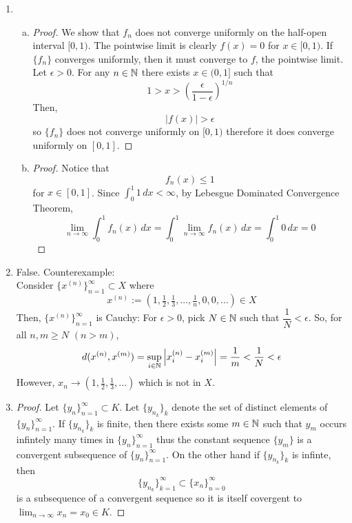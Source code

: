\begin{enumerate}

\item 
	\begin{enumerate}[(a)]
	\item
	\begin{proof}
	We show that $f_n$ does not converge uniformly on the half-open interval $[0,1)$. The pointwise limit is clearly $f(x)=0$ for $x \in [0,1)$. If $\{f_n\}$ converges uniformly, then it must converge to $f$, the pointwise limit. Let $\epsilon >0$. For any $n \in \mathbb{N}$ there exists $x \in (0,1]$ such that
			\[ 1>x > \left( \dfrac{\epsilon}{1-\epsilon} \right)^{1/n} \]
	Then,
			\[ |f(x)| > \epsilon \]
	so $\{f_n\}$ does not converge uniformly on $[0,1)$ therefore it does converge uniformly on $[0,1]$.
	\end{proof}
	
	\item
	\begin{proof}
		Notice that
			\[ f_n(x) \le 1 \]
		for $x \in [0,1]$. Since $\displaystyle\int_0^1 1 \, dx < \infty$, by Lebesgue Dominated Convergence Theorem,
			\[ \lim_{n \to \infty} \int_0^1 f_n(x) \, dx = \int_0^1 \lim_{n \to \infty} f_n(x) \, dx =  \int_0^1 0 \, dx =0\]
	\end{proof}
	\end{enumerate}

\item False. Counterexample: \\
	Consider $\{x^{(n)} \}_{n=1}^\infty \subset X$ where
		\[ x^{(n)} := (1, \tfrac 12, \tfrac 13, \ldots , \tfrac 1{n}, 0,0,\ldots ) \in X\]
	Then, $\{ x^{(n)} \}_{n=1}^\infty$ is Cauchy: For $\epsilon >0$, pick $N \in \mathbb{N}$ such that $\dfrac 1N <\epsilon$.
	So, for all $n,m \ge N$ $(n>m)$,
		\[ d(x^{(n)},x^{(m)}) = \sup_{i \in \mathbb{N}} \left|x^{(n)}_i-x^{(m)}_i\right| = \dfrac 1m < \dfrac 1N < \epsilon \]
	However, $x_n \to (1,\tfrac 12,\tfrac 13,\ldots)$ which is not in $X$.
\item \begin{proof}
	Let $\{y_n\}_{n=1}^\infty \subset K$. Let $\{y_{n_k} \}_k$ denote the set of distinct elements of $\{y_n\}_{n=1}^\infty$. If $\{y_{n_k}\}_k$ is finite, then there exists some $m \in \mathbb{N}$ such that $y_m$ occurs infintely many times in $\{ y_n\}_{n=1}^\infty$ thus the constant sequence $\{y_m\}$ is a convergent subsequence of $\{y_n\}_{n=1}^\infty$. On the other hand if $\{y_{n_k}\}_k$ is infinte, then 
		\[ \{y_{n_k}\}_{k=1}^\infty \subset \{x_n\}_{n=0}^\infty \]
is a subsequence of a convergent sequence so it is itself covergent to $\lim_{n \to \infty} x_n = x_0 \in K$.
\end{proof}


\end{enumerate}
